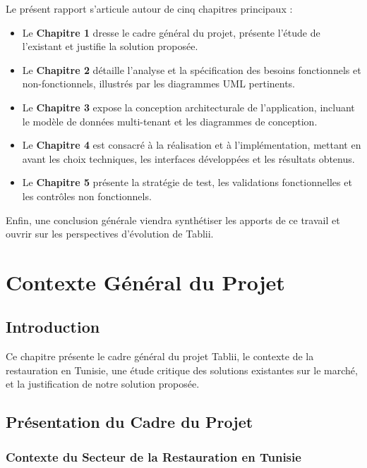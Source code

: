 \documentclass[12pt,a4paper]{report}
\begin{document}
Le présent rapport s'articule autour de cinq chapitres principaux :
\begin{itemize}
    \item Le \textbf{Chapitre 1} dresse le cadre général du projet, présente l'étude de l'existant et justifie la solution proposée.
    \item Le \textbf{Chapitre 2} détaille l'analyse et la spécification des besoins fonctionnels et non-fonctionnels, illustrés par les diagrammes UML pertinents.
    \item Le \textbf{Chapitre 3} expose la conception architecturale de l'application, incluant le modèle de données multi-tenant et les diagrammes de conception.
    \item Le \textbf{Chapitre 4} est consacré à la réalisation et à l'implémentation, mettant en avant les choix techniques, les interfaces développées et les résultats obtenus.
    \item Le \textbf{Chapitre 5} pr\'esente la strat\'egie de test, les validations fonctionnelles et les contr\^oles non fonctionnels.
\end{itemize}

Enfin, une conclusion générale viendra synthétiser les apports de ce travail et ouvrir sur les perspectives d'évolution de Tablii.

\cleardoublepage
\chapter{Contexte Général du Projet}

\section{Introduction}

Ce chapitre présente le cadre général du projet Tablii, le contexte de la restauration en Tunisie, une étude critique des solutions existantes sur le marché, et la justification de notre solution proposée.

\section{Présentation du Cadre du Projet}

\subsection{Contexte du Secteur de la Restauration en Tunisie}
\end{document}
